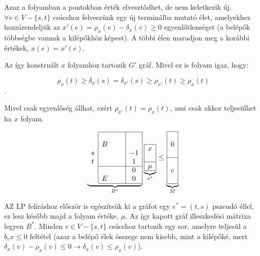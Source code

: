 Azaz a folyamban a pontokban érték elvesztődhet, de nem keletkezik új.
$\forall v \in V-\{s,t\}$ csúcshoz felveszünk egy új terminálba mutató élet,
amelyekhez hozzárendeljük az $x'(e)=\rho_x(v)-\delta_x(v) \geq 0$
egyenlőtlenséget (a belépők többségbe vannak a kilépőkhöz képest). A többi élen
maradjon meg a korábbi értékek, $x(e)=x'(e)$.

Az így konstruált $x$ folyamhoz tartozik $G'$ gráf.  Mivel ez is folyam igaz,
hogy:

\[\rho_{x}(t) \geq \delta_{x}(s) = \delta_{x'}(s) \geq \rho_{x'}(t) \geq 
\rho_{x}(t)\]. 

Mivel csak egyenlőség állhat, ezért $\rho_{x'}(t)=\rho_{x}(t)$, ami csak akkor 
teljesülhet ha $x$ folyam.

\vspace{0.4cm}
\begin{wrapfigure}{L}{0.35\textwidth}
\begin{center}
\vspace{-1.3cm}
\begin{displaymath}
\underbrace{
\begin{array}{c|ccc|c|}
\cline{2-5}
&   & & & \\
&  B& & & \\
s &   & & &-1 \\
t &   & & & 1 \\
\cline{2-5}
&   & & & 0 \\
& E & & & 0 \\
\cline{2-5}
\end{array}}_{B^*}
\underbrace{
\begin{array}{|c|}
\hline
x\\
\\
\hline
\mu\\
\hline
\end{array}}_{x^*}
\leq
\underbrace{
\begin{array}{|c|}
\hline
\\
0\\
\\
\hline
\\
c\\
\\
\hline
\end{array}}_{M}
\end{displaymath}
\vspace{-1.3cm}
\end{center}
\end{wrapfigure}

AZ LP felíráshoz először is egészítsük ki a gráfot egy $e^*=(t,s)$ pszeudó éllel, ez lesz
később majd a folyam értéke, $\mu$. Az így kapott gráf illeszkedési mátrixa legyen $B^*$.
Minden $v \in V - \{s,t\}$ csúcshoz tartozik egy sor, amelyre teljesül a $b_vx\leq 0$ feltétel
(azaz a belépő élek összege nem kisebb, mint a kilépőké, mert $\delta_x(v) - \rho_x(v) \leq
0 \rightarrow \delta_x(v) \leq \rho_x(v)$).

